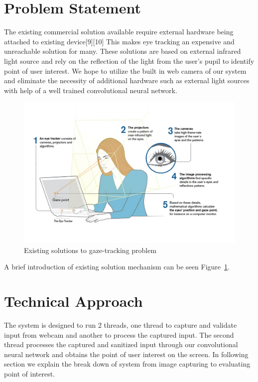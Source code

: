 \documentclass[10pt,twocolumn,letterpaper]{article}
\begin{document}
\section{Problem Statement}
The existing commercial solution available require external hardware
being attached to existing device[9][10] This makes eye tracking an
expensive and unreachable solution for many. These solutions are based
on external infrared light source and rely on the reflection of the
light from the user’s pupil to identify point of user interest. We hope to
utilize the built in web camera of our system and eliminate the necessity
of additional hardware such as external light sources with help of a
well trained convolutional neural network.

\begin{figure}
  \begin{center}
    \includegraphics[width=\linewidth]{existing_solutions}
  \end{center}
  \caption{Existing solutions to gaze-tracking problem}
  \label{fig:existsol}
  \end{figure}

A brief introduction of existing solution mechanism can be seen Figure~\ref{fig:existsol}.

\section{Technical Approach}
The system is designed to run 2 threads, one thread to capture 
and validate input from webcam and another to process the 
captured input. The second thread processes the captured and 
sanitized input through our convolutional neural network and 
obtains the point of user interest on the screen. In following section 
we explain the break down of system from image capturing 
to evaluating point of interest.  
\end{document}
